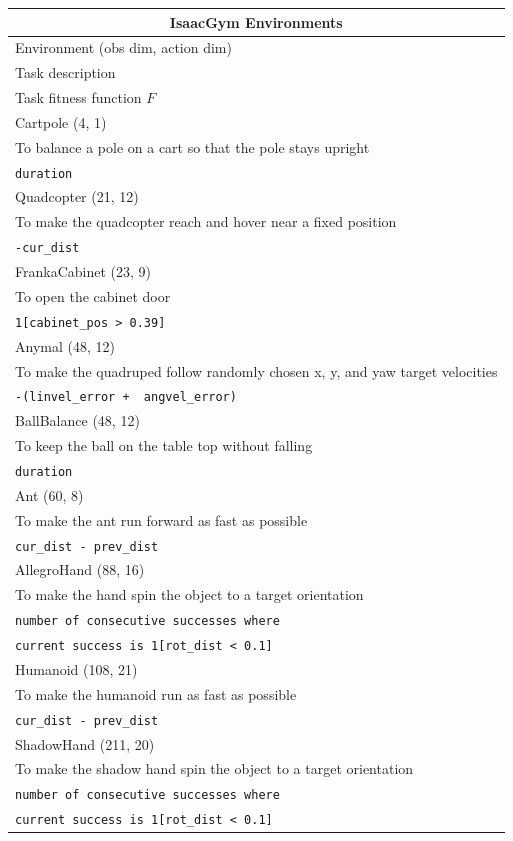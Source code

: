 \begin{tabularx}{\textwidth}{X}
    \toprule
    \multicolumn{1}{c}{IsaacGym Environments} \\[1px]
    \hline
    Environment (obs dim, action dim) \\ Task description \\ Task fitness function $F$ \\[1px]
    \hline
    Cartpole (4, 1) \\ To balance a pole on a cart so that the pole stays upright \\ \verb|duration| \\ [1px]
    \hline
    Quadcopter (21, 12) \\ To make the quadcopter reach and hover near a fixed position \\ \verb|-cur_dist| \\[1px]
    \hline
    FrankaCabinet (23, 9) \\ To open the cabinet door \\ \verb|1[cabinet_pos > 0.39]| \\[1px]
    \hline
    Anymal (48, 12) \\ To make the quadruped follow randomly chosen x, y, and yaw target velocities \\ \verb|-(linvel_error +  angvel_error)| \\[1px]
    \hline
    BallBalance (48, 12) \\ To keep the ball on the table top without falling \\ \verb|duration| \\[1px]
    \hline
    Ant (60, 8) \\ To make the ant run forward as fast as possible \\ \verb|cur_dist - prev_dist| \\[1px]
    \hline
    AllegroHand (88, 16) \\ To make the hand spin the object to a target orientation \\ \verb|number of consecutive successes where| \\ \verb|current success is 1[rot_dist < 0.1]| \\[1px]
    \hline
    Humanoid (108, 21) \\ To make the humanoid run as fast as possible \\ \verb|cur_dist - prev_dist| \\[1px]
    \hline
    ShadowHand (211, 20) \\ To make the shadow hand spin the object to a target orientation \\ \verb|number of consecutive successes where| \\ \verb|current success is 1[rot_dist < 0.1]| \\[1px]
    \bottomrule
\end{tabularx}
